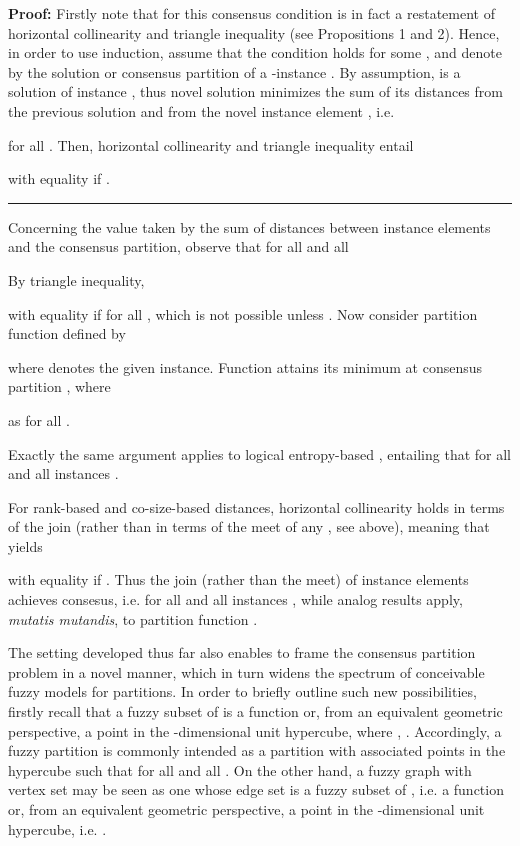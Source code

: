 \documentclass[a4paper,10pt]{article}
\newenvironment{proof}[1][Proof]{\noindent\textbf{#1: }}{\ \rule{0.5em}{0.5em}}
\begin{document}
\begin{proof}
Firstly note that for  this consensus condition is in fact a restatement of horizontal collinearity and triangle inequality (see Propositions 1 and 2). Hence,
in order to use induction, assume that the condition holds for some , and denote by  the solution or consensus partition of a -instance
. By assumption,  is a solution of instance , thus novel solution  minimizes the sum of its
distances from the previous solution  and from the novel instance element , i.e.

for all . Then, horizontal collinearity and triangle inequality entail

with equality if .
\end{proof}  

Concerning the value taken by the sum  of distances between instance elements and the consensus partition,
observe that for all  and all 

By triangle inequality,

with equality if  for all , which is not possible unless . Now consider partition function
 defined by

where  denotes the given instance. Function  attains its minimum at consensus partition
, where

as  for all .

Exactly the same argument applies to logical entropy-based , entailing that
 for all  and all instances .

For rank-based  and co-size-based  distances, horizontal collinearity holds in terms of the join (rather than in terms of the meet of any
, see above), meaning that  yields

with equality if . Thus the join (rather than the meet) of instance elements achieves consesus, i.e.
 for all  and all instances , while analog
results apply, \textit{mutatis mutandis}, to partition function .

The setting developed thus far also enables to frame the consensus partition problem in a novel manner, which in turn widens the spectrum of conceivable fuzzy models
for partitions. In order to briefly outline such new possibilities, firstly recall that a fuzzy subset of  is a function  or,
from an equivalent geometric perspective, a point  in the -dimensional unit hypercube, where , . Accordingly, a fuzzy
partition is commonly intended as a partition  with associated  points  in the hypercube such that 
for all  and all . On the other hand, a fuzzy graph with vertex set  may be seen as one whose edge set is a fuzzy subset of ,
i.e. a function  or, from an equivalent geometric perspective, a point in the -dimensional unit hypercube, i.e.
.
\end{document}
